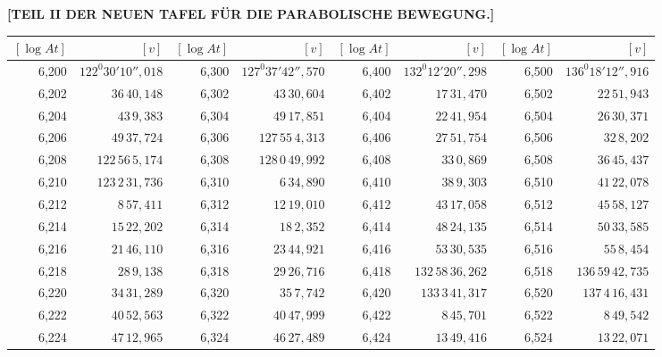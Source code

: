 \clearpage
{}
\begingroup
\centering
\fontsize{9}{9}\selectfont
\setlength{\tabcolsep}{.2pt}
\renewcommand{\arraystretch}{.9}
\setlength{\parskip}{0pt}
\textbf{[TEIL II DER NEUEN TAFEL FÜR DIE PARABOLISCHE BEWEGUNG.]}
\par\vspace{7pt}
\begin{tabular}{|r|r||r|r||r|r||r|r|}
\hline
\([\log At]\) & \([v]\) & \([\log At]\) & \([v]\) & \([\log At]\) & \([v]\) & \([\log At]\) & \([v]\) \\
\hline
6,200 & \(122^{0}30'10'',\!018\) & 6,300 & \(127^{0}37'42'',\!570\) & 6,400 & \(132^{0}12'20'',\!298\) & 6,500 & \(136^{0}18'12'',\!916\) \\[1pt]
6,202 & \(36\,40,\!148\) & 6,302 & \(43\,30,\!604\) & 6,402 & \(17\,31,\!470\) & 6,502 & \(22\,51,\!943\) \\
6,204 & \(43\,9,\!383\) & 6,304 & \(49\,17,\!851\) & 6,404 & \(22\,41,\!954\) & 6,504 & \(26\,30,\!371\) \\
6,206 & \(49\,37,\!724\) & 6,306 & \(127\,55\,4,\!313\) & 6,406 & \(27\,51,\!754\) & 6,506 & \(32\,8,\!202\) \\
6,208 & \(122\,56\,5,\!174\) & 6,308 & \(128\,0\,49,\!992\) & 6,408 & \(33\,0,\!869\) & 6,508 & \(36\,45,\!437\) \\
6,210 & \(123\,2\,31,\!736\) & 6,310 & \(6\,34,\!890\) & 6,410 & \(38\,9,\!303\) & 6,510 & \(41\,22,\!078\) \\[1pt]
6,212 & \(8\,57,\!411\) & 6,312 & \(12\,19,\!010\) & 6,412 & \(43\,17,\!058\) & 6,512 & \(45\,58,\!127\) \\
6,214 & \(15\,22,\!202\) & 6,314 & \(18\,2,\!352\) & 6,414 & \(48\,24,\!135\) & 6,514 & \(50\,33,\!585\) \\
6,216 & \(21\,46,\!110\) & 6,316 & \(23\,44,\!921\) & 6,416 & \(53\,30,\!535\) & 6,516 & \(55\,8,\!454\) \\
6,218 & \(28\,9,\!138\) & 6,318 & \(29\,26,\!716\) & 6,418 & \(132\,58\,36,\!262\) & 6,518 & \(136\,59\,42,\!735\) \\
6,220 & \(34\,31,\!289\) & 6,320 & \(35\,7,\!742\) & 6,420 & \(133\,3\,41,\!317\) & 6,520 & \(137\,4\,16,\!431\) \\[1pt]
6,222 & \(40\,52,\!563\) & 6,322 & \(40\,47,\!999\) & 6,422 & \(8\,45,\!701\) & 6,522 & \(8\,49,\!542\) \\
6,224 & \(47\,12,\!965\) & 6,324 & \(46\,27,\!489\) & 6,424 & \(13\,49,\!416\) & 6,524 & \(13\,22,\!071\) \\

\end{tabular}
